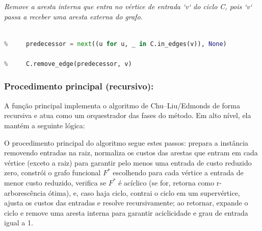 \begin{tcolorbox}[
        enhanced, breakable,
        colframe=blue!60!black, colback=blue!2,
        colbacktitle=blue!15, coltitle=black,
        title={Remover arco interno na reexpansão},
        boxed title style={sharp corners, boxrule=0.6pt},
        sharp corners, boxrule=0.6pt
    ]
    \emph{Remove a aresta interna que entra no vértice de entrada `v` do ciclo C, pois `v` passa a receber uma aresta externa do grafo.}
    \tcblower
    \begin{lstlisting}[mathescape=true, language=Python]
% def remove_internal_edge_to_cycle_entry(C: nx.DiGraph, v):

%     predecessor = next((u for u, _ in C.in_edges(v)), None)

%     C.remove_edge(predecessor, v) 
\end{lstlisting}
\end{tcolorbox}



\subsubsection{Procedimento principal (recursivo):}
A função principal implementa o algoritmo de Chu–Liu/Edmonds de forma recursiva e atua como um orquestrador das fases do método. Em alto nível, ela mantém a seguinte lógica:

% 

% 

% 

% 

% 


O procedimento principal do algoritmo segue estes passos: prepara a instância removendo entradas na raiz, normaliza os custos das arestas que entram em cada vértice (exceto a raiz) para garantir pelo menos uma entrada de custo reduzido zero, constrói o grafo funcional $F^*$ escolhendo para cada vértice a entrada de menor custo reduzido, verifica se $F^*$ é acíclico (se for, retorna como r-arborescência ótima), e, caso haja ciclo, contrai o ciclo em um supervértice, ajusta os custos das entradas e resolve recursivamente; ao retornar, expande o ciclo e remove uma aresta interna para garantir aciclicidade e grau de entrada igual a 1.


